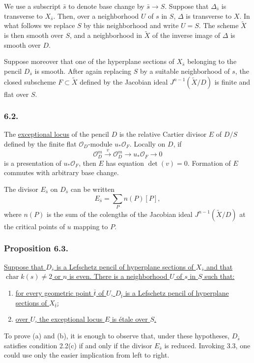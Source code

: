 We use a subscript $\bar s$ to denote base change by
$\bar s\to S$.  Suppose that $\Delta_{\bar s}$ is transverse to
$X_{\bar s}$.  Then, over a neighborhood $U$ of $s$ in $S$,
$\Delta$ is transverse to $X$.  In what follows we replace $S$ by
this neighborhood and write $U=S$.  The scheme $\widetilde X$ is then
smooth over $S$, and a neighborhood in $\widetilde X$ of the inverse
image of $\Delta$ is smooth over $D$.

Suppose moreover that one of the hyperplane sections of $X_{\bar s}$
belonging to the pencil $D_{\bar s}$ is smooth.  After again replacing
$S$ by a suitable neighborhood of $s$, the closed subscheme
$F\subset\widetilde X$ defined by the Jacobian ideal
$J^{n-1}(\widetilde X/D)$ is finite and flat over $S$.

\subsubsection*{6.2.}
The \underline{exceptional locus} of the pencil $D$ is the relative
Cartier divisor $E$ of $D/S$ defined by the finite flat
$\mathcal O_D$-module $u_*\mathcal O_F$.  Locally on $D$, if
\[
\mathcal O_D^m\xrightarrow{\ v\ }\mathcal O_D^m
\longrightarrow u_*\mathcal O_F\longrightarrow0
\]
is a presentation of $u_*\mathcal O_F$, then $E$ has equation
$\det(v)=0$.  Formation of $E$ commutes with arbitrary base change.

The divisor $E_{\bar s}$ on $D_{\bar s}$ can be written
\[
E_{\bar s}=\sum_P n(P)[P],
\]
where $n(P)$ is the sum of the colengths of the Jacobian ideal
$J^{n-1}(\widetilde X/D)$ at the critical points of $u$ mapping to
$P$.

\subsubsection*{Proposition 6.3.}
\underline{Suppose that $D_{\bar s}$ is a Lefschetz pencil of
hyperplane sections of $X_{\bar s}$ and that
$\operatorname{char}k(s)\ne2$ or $n$ is even.  There is a
neighborhood $U$ of $s$ in $S$ such that:}
\begin{enumerate}
\item[(a)] \underline{for every geometric point $\bar t$ of $U$,
$D_{\bar t}$ is a Lefschetz pencil of hyperplane sections of
$X_{\bar t}$;}
\item[(b)] \underline{over $U$, the exceptional locus $E$ is étale
over $S$.}
\end{enumerate}
To prove (a) and (b), it is enough to observe that, under these
hypotheses, $D_{\bar s}$ satisfies condition 2.2(c) if and only if
the divisor $E_{\bar s}$ is reduced.  Invoking 3.3, one could use
only the easier implication from left to right.

